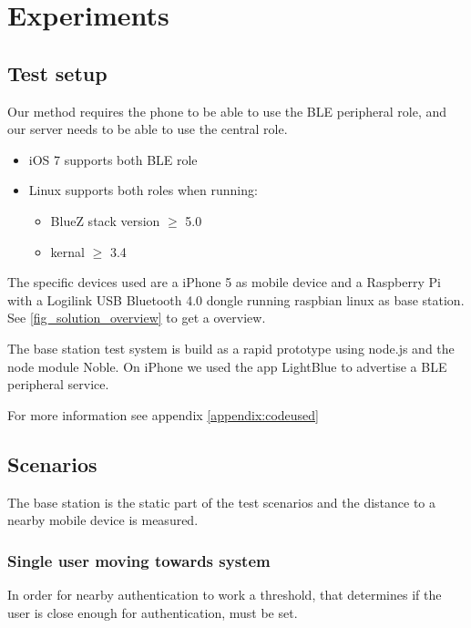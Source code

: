 \section{Experiments}

\subsection{Test setup}

Our method requires the phone to be able to use the BLE peripheral role, and our server needs to be able to use the central role.
\begin{itemize}
	\item iOS 7 supports both BLE role
	\item Linux supports both roles when running:
	\begin{itemize}
		\item BlueZ stack version $\geq$ 5.0
		\item kernal $\geq$ 3.4 
	\end{itemize}
\end{itemize}
%
The specific devices used are a iPhone 5 as mobile device and a Raspberry Pi with a Logilink USB Bluetooth 4.0 dongle running raspbian linux as base station. See \cref{fig_solution_overview} to get a overview.

The base station test system is build as a rapid prototype using node.js and the node module Noble.
On iPhone we used the app LightBlue to advertise a BLE peripheral service.

For more information see appendix \ref{appendix:codeused}

\subsection{Scenarios}

The base station is the static part of the test scenarios and the distance to a nearby mobile device is measured.




\subsubsection{Single user moving towards system}
\label{section:MovingTowardsSystem}
In order for nearby authentication to work a threshold, that determines if the user is close enough for authentication, must be set.

